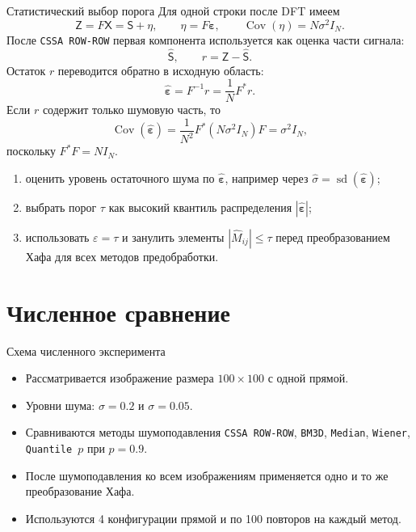 \documentclass[unicode,notheorems]{beamer}
\begin{document}
\begin{frame}{Статистический выбор порога}
	\scriptsize
	Для одной строки после DFT имеем
	\[
		\mathsf{Z} = F\mathsf{X} = \mathsf{S}+\eta,
		\qquad
		\eta=F\boldsymbol{\varepsilon},
		\qquad
		\operatorname{Cov}(\eta)=N\sigma^2 I_N.
	\]
	После \texttt{CSSA ROW-ROW} первая компонента используется как оценка части сигнала:
	\[
		\widehat{\mathsf{S}},
		\qquad
		r=\mathsf{Z}-\widehat{\mathsf{S}}.
	\]
	Остаток $r$ переводится обратно в исходную область:
	\[
		\widehat{\boldsymbol{\varepsilon}}=F^{-1}r=\frac{1}{N}F^{*}r.
	\]
	Если $r$ содержит только шумовую часть, то
	\[
		\operatorname{Cov}(\widehat{\boldsymbol{\varepsilon}})
		=
		\frac{1}{N^2}F^{*}(N\sigma^2 I_N)F
		=
		\sigma^2 I_N,
	\]
	поскольку $F^{*}F=N I_N$.

	\vspace{-0.15cm}
	\begin{enumerate}
		\item оценить уровень остаточного шума по $\widehat{\boldsymbol{\varepsilon}}$, например через $\widehat\sigma=\operatorname{sd}(\widehat{\boldsymbol{\varepsilon}})$;
		\item выбрать порог $\tau$ как высокий квантиль распределения $|\widehat{\boldsymbol{\varepsilon}}|$;
		\item использовать $\varepsilon=\tau$ и занулить элементы $|\widehat M_{ij}|\le\tau$ перед преобразованием Хафа для всех методов предобработки.
	\end{enumerate}
\end{frame}

\section{Численное сравнение}

\begin{frame}{Схема численного эксперимента}
	\begin{itemize}
		\item Рассматривается изображение размера $100\times100$ с одной прямой.
		\item Уровни шума: $\sigma = 0.2$ и $\sigma = 0.05$.
		\item Сравниваются методы шумоподавления \texttt{CSSA ROW-ROW}, \texttt{BM3D}, \texttt{Median}, \texttt{Wiener}, \texttt{Quantile $p$} при $p=0.9$.
		\item После шумоподавления ко всем изображениям применяется одно и то же преобразование Хафа.
		\item Используются 4 конфигурации прямой и по 100 повторов на каждый метод.
	\end{itemize}
\end{frame}
\end{document}
